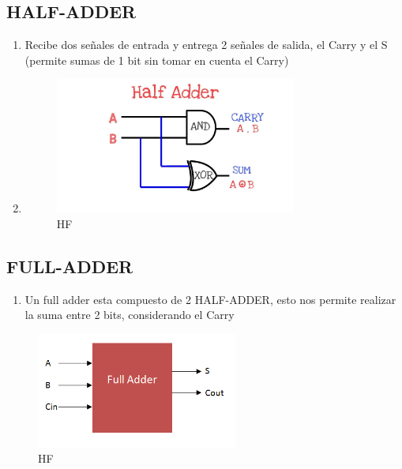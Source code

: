\documentclass{article}
\begin{document}
        \subsection{HALF-ADDER}
        \begin{enumerate}
            \item Recibe dos señales de entrada y entrega 2 señales de salida, el Carry y el S (permite sumas de 1 bit sin tomar en cuenta el Carry)
           \item \begin{figure}
                \includegraphics[width=300px]{halfadder.jpg}
                \caption{HF}
                \label{fig:HALF-ADDER}
            \end{figure}
        \end{enumerate}
        
        \subsection{FULL-ADDER}
            \begin{enumerate}
                \item Un full adder esta compuesto de 2 HALF-ADDER, esto nos permite realizar la suma entre 2 bits, considerando el Carry
            \end{enumerate}
             \begin{figure}
                \includegraphics[width=250px]{fulladder.png}
                \caption{HF}
                \label{fig:Full-adder}
            \end{figure}
\end{document}
